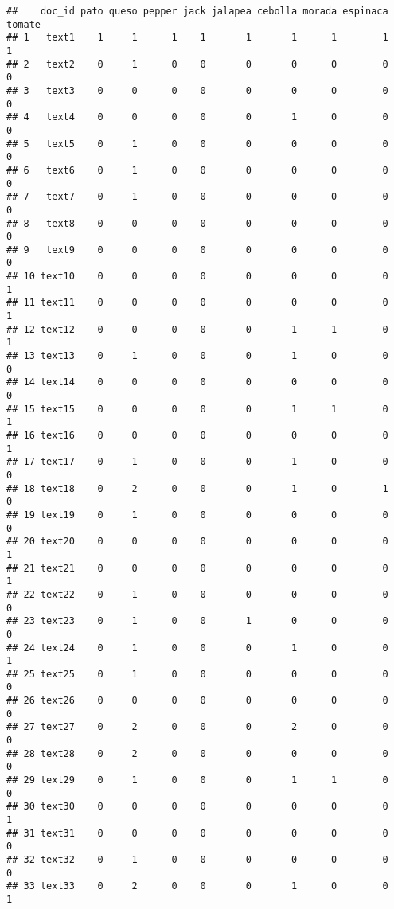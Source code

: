 \documentclass[
]{article}
\begin{document}
\begin{verbatim}
##    doc_id pato queso pepper jack jalapea cebolla morada espinaca tomate
## 1   text1    1     1      1    1       1       1      1        1      1
## 2   text2    0     1      0    0       0       0      0        0      0
## 3   text3    0     0      0    0       0       0      0        0      0
## 4   text4    0     0      0    0       0       1      0        0      0
## 5   text5    0     1      0    0       0       0      0        0      0
## 6   text6    0     1      0    0       0       0      0        0      0
## 7   text7    0     1      0    0       0       0      0        0      0
## 8   text8    0     0      0    0       0       0      0        0      0
## 9   text9    0     0      0    0       0       0      0        0      0
## 10 text10    0     0      0    0       0       0      0        0      1
## 11 text11    0     0      0    0       0       0      0        0      1
## 12 text12    0     0      0    0       0       1      1        0      1
## 13 text13    0     1      0    0       0       1      0        0      0
## 14 text14    0     0      0    0       0       0      0        0      0
## 15 text15    0     0      0    0       0       1      1        0      1
## 16 text16    0     0      0    0       0       0      0        0      1
## 17 text17    0     1      0    0       0       1      0        0      0
## 18 text18    0     2      0    0       0       1      0        1      0
## 19 text19    0     1      0    0       0       0      0        0      0
## 20 text20    0     0      0    0       0       0      0        0      1
## 21 text21    0     0      0    0       0       0      0        0      1
## 22 text22    0     1      0    0       0       0      0        0      0
## 23 text23    0     1      0    0       1       0      0        0      0
## 24 text24    0     1      0    0       0       1      0        0      1
## 25 text25    0     1      0    0       0       0      0        0      0
## 26 text26    0     0      0    0       0       0      0        0      0
## 27 text27    0     2      0    0       0       2      0        0      0
## 28 text28    0     2      0    0       0       0      0        0      0
## 29 text29    0     1      0    0       0       1      1        0      0
## 30 text30    0     0      0    0       0       0      0        0      1
## 31 text31    0     0      0    0       0       0      0        0      0
## 32 text32    0     1      0    0       0       0      0        0      0
## 33 text33    0     2      0    0       0       1      0        0      1

\end{verbatim}
\end{document}
